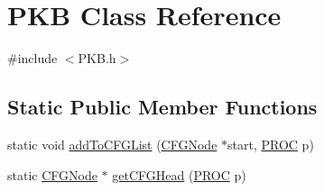 \hypertarget{class_p_k_b}{\section{P\-K\-B Class Reference}
\label{class_p_k_b}
}


{\ttfamily \#include $<$P\-K\-B.\-h$>$}

\subsection*{Static Public Member Functions}
\begin{DoxyCompactItemize}
\item 
static void \hyperlink{class_p_k_b_ad04fe66a4c4025d324c397cdea48ceb9}{add\-To\-C\-F\-G\-List} (\hyperlink{class_c_f_g_node}{C\-F\-G\-Node} $\ast$start, \hyperlink{std_afx_8h_aa07ea1d188c7b45668f1bd82ffd6d87e}{P\-R\-O\-C} p)
\item 
static \hyperlink{class_c_f_g_node}{C\-F\-G\-Node} $\ast$ \hyperlink{class_p_k_b_a9b1870153dfe169e9f112bb3a73d5692}{get\-C\-F\-G\-Head} (\hyperlink{std_afx_8h_aa07ea1d188c7b45668f1bd82ffd6d87e}{P\-R\-O\-C} p)
\end{DoxyCompactItemize}

